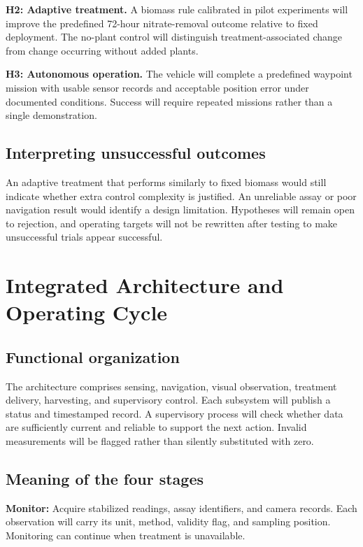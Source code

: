 \documentclass[12pt,a4paper]{article}
\newcommand{\papersection}[1]{\clearpage\section{#1}}
\begin{document}
\textbf{H2: Adaptive treatment.} A biomass rule calibrated in pilot experiments will improve the predefined 72-hour nitrate-removal outcome relative to fixed deployment. The no-plant control will distinguish treatment-associated change from change occurring without added plants.

\textbf{H3: Autonomous operation.} The vehicle will complete a predefined waypoint mission with usable sensor records and acceptable position error under documented conditions. Success will require repeated missions rather than a single demonstration.

\subsection{Interpreting unsuccessful outcomes}
An adaptive treatment that performs similarly to fixed biomass would still indicate whether extra control complexity is justified. An unreliable assay or poor navigation result would identify a design limitation. Hypotheses will remain open to rejection, and operating targets will not be rewritten after testing to make unsuccessful trials appear successful.

\papersection{Integrated Architecture and Operating Cycle}
\subsection{Functional organization}
The architecture comprises sensing, navigation, visual observation, treatment delivery, harvesting, and supervisory control. Each subsystem will publish a status and timestamped record. A supervisory process will check whether data are sufficiently current and reliable to support the next action. Invalid measurements will be flagged rather than silently substituted with zero.

\begin{center}
\end{center}

\subsection{Meaning of the four stages}
\textbf{Monitor:} Acquire stabilized readings, assay identifiers, and camera records. Each observation will carry its unit, method, validity flag, and sampling position. Monitoring can continue when treatment is unavailable.
\end{document}
